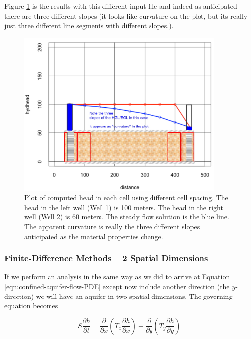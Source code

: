 Figure \ref{fig:aquifer-1d-solution-case3} is the results with this different input file and indeed as anticipated there are three different slopes (it looks like curvature on the plot, but its really just three different line segments with different slopes.).

\begin{figure}[h!] %
   \centering
   \includegraphics[width=4in]{./17-SteadyGroundwaterFlow/aquifer-1d-solution-case3.jpg} 
   \caption{Plot of computed head in each cell using different cell spacing.   The head in the left well (Well 1) is 100 meters.   The head in the right well (Well 2) is 60 meters.  The steady flow solution is the blue line.  The apparent curvature is really the three different slopes anticipated as the material properties change.}
   \label{fig:aquifer-1d-solution-case3}
\end{figure}
\subsubsection{Finite-Difference Methods -- 2 Spatial Dimensions}
If we perform an analysis in the same way as we did to arrive at Equation \ref{eqn:confined-aquifer-flow-PDE} except now include another direction (the $y$-direction) we will have an aquifer in two spatial dimensions.  The governing equation becomes
  
\begin{equation}
S \frac{\partial h}{\partial t} = 
\frac{\partial}{\partial x}({T_x \frac{\partial h}{\partial x}})
+
\frac{\partial}{\partial y}({T_y \frac{\partial h}{\partial y}})
\label{eqn:confined-aquifer-flow-PDE2D}
\end{equation}

